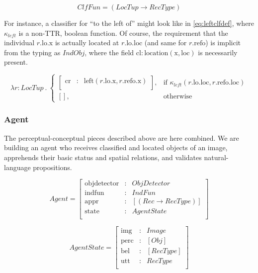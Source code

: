 \begin{equation}\label{eq:clf}
ClfFun = ( LocTup \rightarrow RecType )
\end{equation}

For instance, a classifier for ``to the left of'' might look like in \autoref{eq:leftclfdef}, where $\kappa_{left}$ is a non-TTR, boolean function.
Of course, the requirement that the individual $r.\text{lo}.\text{x}$ is actually located at $r.\text{lo}.\text{loc}$ (and same for $r.\text{refo}$) is implicit from the typing as $IndObj$, where the field $\text{cl} : \text{location}(\text{x}, \text{loc})$ is necessarily present.

\begin{equation}\label{eq:leftclfdef}
\lambda r : LocTup \ .\ 
\begin{cases}
\left[\begin{array}{rcl}
    \text{cr} &:& \text{left}(r.\text{lo}.\text{x}, r.\text{refo}.\text{x}) \\
\end{array}\right],
& \text{if } \kappa_{left}(r.\text{lo}.\text{loc}, r.\text{refo}.\text{loc}) \\
[], & \text{otherwise}
\end{cases}
\end{equation}



\subsubsection{Agent}

The perceptual-conceptual pieces described above are here combined.
We are building an agent who receives classified and located objects of an image, apprehends their basic status and spatial relations, and validates natural-language propositions.

\begin{equation}\label{eq:agent}
Agent = \left[\begin{array}{rcl}
    \text{objdetector} &:& ObjDetector \\
    \text{indfun} &:& IndFun \\
    \text{appr} &:& [(Rec \rightarrow RecType)] \\
    \text{state} &:& AgentState \\
    \end{array}\right]
\end{equation}

\begin{equation}\label{eq:state}
AgentState = \left[\begin{array}{rcl}
    \text{img} &:& Image \\
    \text{perc} &:& [Obj] \\
    \text{bel} &:& [RecType] \\
    \text{utt} &:& RecType \\
    \end{array}\right]
\end{equation}

